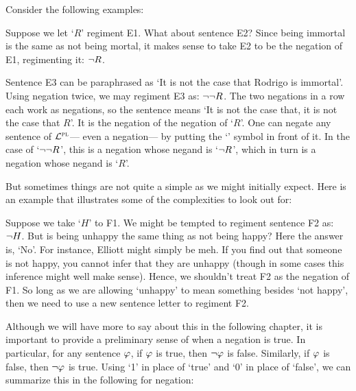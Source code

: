 
Consider the following examples:

\begin{earg}
\end{earg}

Suppose we let `$R$' regiment E1.
What about sentence E2?
Since being immortal is the same as not being mortal, it makes sense to take E2 to be the negation of E1, regimenting it: $\neg R$.

Sentence E3 can be paraphrased as `It is not the case that Rodrigo is immortal'.
Using negation twice, we may regiment E3 as: $\neg \neg R$.
The two negations in a row each work as negations, so the sentence means `It is not the case that, it is not the case that $R$'.
It is the negation of the negation of `$R$'.
One can negate any sentence of $\mathcal{L}^{\textsc{pl}}$--- even a negation--- by putting the `\enot' symbol in front of it.
In the case of `$\neg\neg R$', this is a negation whose negand is `$\neg R$', which in turn is a negation whose negand is `$R$'.

But sometimes things are not quite a simple as we might initially expect.
Here is an example that illustrates some of the complexities to look out for:

\begin{earg}
\end{earg}

Suppose we take `$H$' to F1.
We might be tempted to regiment sentence F2 as: $\neg{H}$.
But is being unhappy the same thing as not being happy? 
Here the answer is, `No'.
For instance, Elliott might simply be meh.
If you find out that someone is not happy, you cannot infer that they are unhappy (though in some cases this inference might well make sense).
Hence, we shouldn't treat F2 as the negation of F1.
So long as we are allowing `unhappy' to mean something besides `not happy', then we need to use a new sentence letter to regiment F2.

Although we will have more to say about this in the following chapter, it is important to provide a preliminary sense of when a negation is true.
In particular, for any sentence $\varphi$, if $\varphi$ is true, then $\neg\varphi$ is false.
Similarly, if $\varphi$ is false, then $\neg\varphi$ is true.
Using `1' in place of `true' and `0' in place of `false', we can summarize this in the following  for negation:

